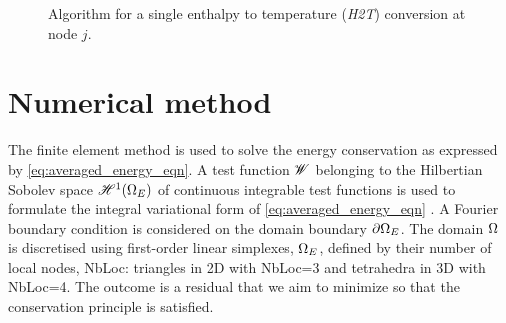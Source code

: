 \begin{figure}[htbp]
\caption{Algorithm for a single enthalpy to temperature (\emph{H2T}) conversion at node $j$.} \label{fig:algorithm_h2t}
\end{figure}

\section{Numerical method}
The finite element method is used to solve the energy conservation as expressed by \cref{eq:averaged_energy_eqn}. 
A test function $\mathscr{W}$ belonging to the Hilbertian Sobolev space $\mathscr{H}^1(\Omega_E)$ of continuous integrable test functions 
is used to formulate the integral variational form of \cref{eq:averaged_energy_eqn} \citep{suli_lecture_2000}. 
A Fourier boundary condition is considered on the domain boundary $\partial \Omega_E$. The domain $\Omega$
is discretised using first-order linear simplexes, $\Omega_E$, defined by their number of local nodes, NbLoc: triangles 
in 2D with NbLoc=3 and tetrahedra in 3D with  NbLoc=4. The outcome is a residual that we aim to minimize so that the 
conservation principle is satisfied. 

